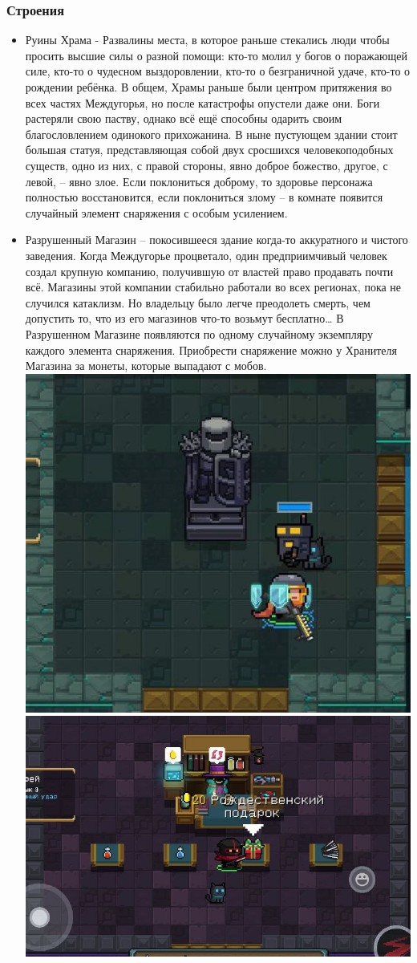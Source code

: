 \documentclass{article}
\begin{document}
\subsubsection{Строения}
\begin{itemize}
\item Руины Храма - Развалины места, в которое раньше стекались люди чтобы просить высшие силы о разной помощи: кто-то молил у богов о поражающей силе, кто-то о чудесном выздоровлении, кто-то о безграничной удаче, кто-то о рождении ребёнка. В общем, Храмы раньше были центром притяжения во всех частях Междугорья, но после катастрофы опустели даже они. Боги растеряли свою паству, однако всё ещё способны одарить своим благословлением одинокого прихожанина.
В ныне пустующем здании стоит большая статуя, представляющая собой двух сросшихся человекоподобных существ, одно из них, с правой стороны, явно доброе божество, другое, с левой, – явно злое. Если поклониться доброму, то здоровье персонажа полностью восстановится, если поклониться злому – в комнате появится случайный элемент снаряжения с особым усилением. 
\item Разрушенный Магазин – покосившееся здание когда-то аккуратного и чистого заведения. Когда Междугорье процветало, один предприимчивый человек создал крупную компанию, получившую от властей право продавать почти всё.  Магазины этой компании стабильно работали во всех регионах, пока не случился катаклизм. Но владельцу было легче преодолеть смерть, чем допустить то, что из его магазинов что-то возьмут бесплатно…
В Разрушенном Магазине появляются по одному случайному экземпляру каждого элемента снаряжения. Приобрести снаряжение можно у Хранителя Магазина за монеты, которые выпадают с мобов.\\
\includegraphics[width=0.3\linewidth]{images/dd_hram.jpg}\hspace{0.5cm}\includegraphics[width=0.4\linewidth]{images/dd_store.jpg}
\end{itemize}
\end{document}
